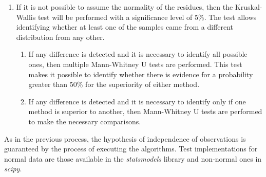 \begin{enumerate}
\begin{enumerate}
\begin{enumerate}
					\end{enumerate}
				\end{enumerate}
				\item If it is not possible to assume the normality of the residues, then the Kruskal-Wallis test will be performed with a significance level of 5\%. The test allows identifying whether at least one of the samples came from a different distribution from any other.
				\begin{enumerate}
					\item If any difference is detected and it is necessary to identify all possible ones, then multiple Mann-Whitney U tests are performed. This test makes it possible to identify whether there is evidence for a probability greater than 50\% for the superiority of either method.
					\item If any difference is detected and it is necessary to identify only if one method is superior to another, then Mann-Whitney U tests are performed to make the necessary comparisons.
				\end{enumerate}
			\end{enumerate}
			As in the previous process, the hypothesis of independence of observations is guaranteed by the process of executing the algorithms. Test implementations for normal data are those available in the \textit{statsmodels} library and non-normal ones in \textit{scipy}.
			

